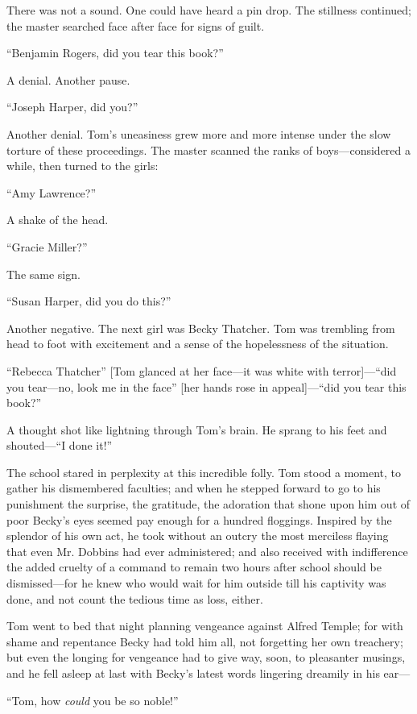 \documentclass{book}
\begin{document}
There was not a sound. One could have heard a pin drop. The stillness continued; the master searched face after face for signs of guilt.

“Benjamin Rogers, did you tear this book?”

A denial. Another pause.

“Joseph Harper, did you?”

Another denial. Tom’s uneasiness grew more and more intense under the slow torture of these proceedings. The master scanned the ranks of boys—considered a while, then turned to the girls:

“Amy Lawrence?”

A shake of the head.

“Gracie Miller?”

The same sign.

“Susan Harper, did you do this?”

Another negative. The next girl was Becky Thatcher. Tom was trembling from head to foot with excitement and a sense of the hopelessness of the situation.

“Rebecca Thatcher” [Tom glanced at her face—it was white with terror]—“did you tear—no, look me in the face” [her hands rose in appeal]—“did you tear this book?”

A thought shot like lightning through Tom’s brain. He sprang to his feet and shouted—“I done it!”

The school stared in perplexity at this incredible folly. Tom stood a moment, to gather his dismembered faculties; and when he stepped forward to go to his punishment the surprise, the gratitude, the adoration that shone upon him out of poor Becky’s eyes seemed pay enough for a hundred floggings. Inspired by the splendor of his own act, he took without an outcry the most merciless flaying that even Mr. Dobbins had ever administered; and also received with indifference the added cruelty of a command to remain two hours after school should be dismissed—for he knew who would wait for him outside till his captivity was done, and not count the tedious time as loss, either.

Tom went to bed that night planning vengeance against Alfred Temple; for with shame and repentance Becky had told him all, not forgetting her own treachery; but even the longing for vengeance had to give way, soon, to pleasanter musings, and he fell asleep at last with Becky’s latest words lingering dreamily in his ear—

“Tom, how \emph{could} you be so noble!”
\end{document}
